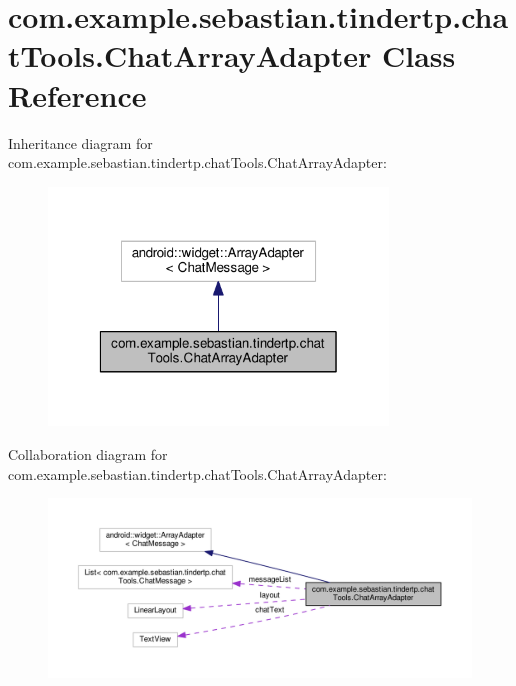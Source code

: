 \hypertarget{classcom_1_1example_1_1sebastian_1_1tindertp_1_1chatTools_1_1ChatArrayAdapter}{}\section{com.\+example.\+sebastian.\+tindertp.\+chat\+Tools.\+Chat\+Array\+Adapter Class Reference}
\label{classcom_1_1example_1_1sebastian_1_1tindertp_1_1chatTools_1_1ChatArrayAdapter}


Inheritance diagram for com.\+example.\+sebastian.\+tindertp.\+chat\+Tools.\+Chat\+Array\+Adapter\+:
\nopagebreak
\begin{figure}[H]
\begin{center}
\leavevmode
\includegraphics[width=256pt]{classcom_1_1example_1_1sebastian_1_1tindertp_1_1chatTools_1_1ChatArrayAdapter__inherit__graph}
\end{center}
\end{figure}


Collaboration diagram for com.\+example.\+sebastian.\+tindertp.\+chat\+Tools.\+Chat\+Array\+Adapter\+:
\nopagebreak
\begin{figure}[H]
\begin{center}
\leavevmode
\includegraphics[width=350pt]{classcom_1_1example_1_1sebastian_1_1tindertp_1_1chatTools_1_1ChatArrayAdapter__coll__graph}
\end{center}
\end{figure}
